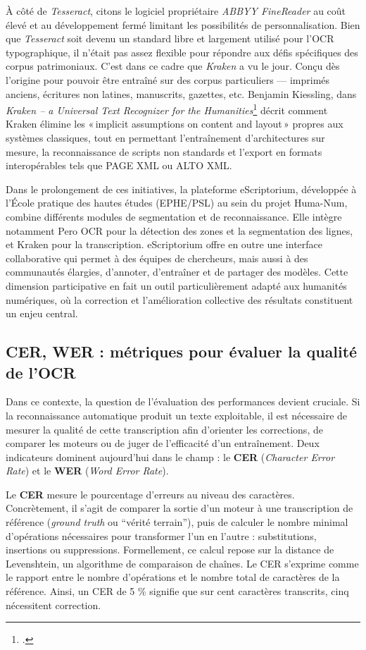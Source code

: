 À côté de \emph{Tesseract}, citons le logiciel propriétaire \emph{ABBYY FineReader} au coût élevé et au développement fermé limitant les possibilités de personnalisation. Bien que \emph{Tesseract} soit devenu un standard libre et largement utilisé pour l’OCR typographique, il n’était pas assez flexible pour répondre aux défis spécifiques des corpus patrimoniaux. C’est dans ce cadre que \emph{Kraken} a vu le jour. Conçu dès l’origine pour pouvoir être entraîné sur des corpus particuliers — imprimés anciens, écritures non latines, manuscrits, gazettes, etc. Benjamin Kiessling, dans \emph{Kraken – a Universal Text Recognizer for the Humanities}\footcite[][]{kiessling} décrit comment Kraken élimine les « implicit assumptions on content and layout » propres aux systèmes classiques, tout en permettant l’entraînement d’architectures sur mesure, la reconnaissance de scripts non standards et l’export en formats interopérables tels que PAGE XML ou ALTO XML.

Dans le prolongement de ces initiatives, la plateforme eScriptorium, développée à l’École pratique des hautes études (EPHE/PSL) au sein du projet Huma-Num, combine différents modules de segmentation et de reconnaissance. Elle intègre notamment Pero OCR pour la détection des zones et la segmentation des lignes, et Kraken pour la transcription. eScriptorium offre en outre une interface collaborative qui permet à des équipes de chercheurs, mais aussi à des communautés élargies, d’annoter, d’entraîner et de partager des modèles. Cette dimension participative en fait un outil particulièrement adapté aux humanités numériques, où la correction et l’amélioration collective des résultats constituent un enjeu central.

\subsection{CER, WER : métriques pour évaluer la qualité de l'OCR}

Dans ce contexte, la question de l’évaluation des performances devient cruciale. Si la reconnaissance automatique produit un texte exploitable, il est nécessaire de mesurer la qualité de cette transcription afin d’orienter les corrections, de comparer les moteurs ou de juger de l’efficacité d’un entraînement. Deux indicateurs dominent aujourd’hui dans le champ : le \textbf{CER} (\emph{Character Error Rate}) et le \textbf{WER} (\emph{Word Error Rate}).

Le \textbf{CER} mesure le pourcentage d’erreurs au niveau des caractères. Concrètement, il s’agit de comparer la sortie d’un moteur à une transcription de référence (\emph{ground truth} ou \enquote{vérité terrain}), puis de calculer le nombre minimal d’opérations nécessaires pour transformer l’un en l’autre : substitutions, insertions ou suppressions. Formellement, ce calcul repose sur la distance de Levenshtein, un algorithme de comparaison de chaînes. Le CER s’exprime comme le rapport entre le nombre d’opérations et le nombre total de caractères de la référence. Ainsi, un CER de 5 \% signifie que sur cent caractères transcrits, cinq nécessitent correction.

